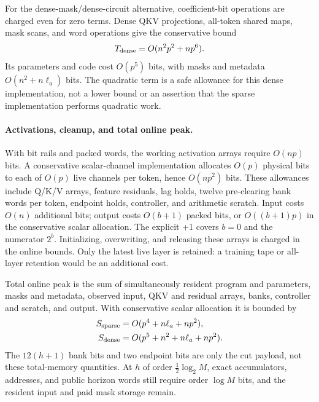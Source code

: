 For the dense-mask/dense-circuit alternative, coefficient-bit operations
are charged even for zero terms. Dense QKV projections, all-token shared
maps, mask scans, and word operations give the conservative bound
\begin{equation}\label{eq:impl-dense-work}
 T_{\rm dense}=O(n^2p^2+np^6).
\end{equation}
Its parameters and code cost $O(p^5)$ bits, with masks and metadata
$O(n^2+n\ell_a)$ bits. The quadratic term is a safe allowance for this
dense implementation, not a lower bound or an assertion that the sparse
implementation performs quadratic work.

\paragraph{Activations, cleanup, and total online peak.}
With bit rails and packed words, the working activation arrays require
$O(np)$ bits. A conservative scalar-channel implementation allocates
$O(p)$ physical bits to each of $O(p)$ live channels per token, hence
$O(np^2)$ bits. These allowances include Q/K/V arrays, feature residuals,
lag holds, twelve pre-clearing bank words per token, endpoint holds,
controller, and arithmetic scratch. Input costs $O(n)$ additional bits;
output costs $O(b+1)$ packed bits, or $O((b+1)p)$ in the conservative
scalar allocation. The explicit +1 covers $b=0$ and the numerator $2^b$.
Initializing, overwriting, and releasing these arrays is charged in the
online bounds. Only the latest live layer is retained: a training tape or
all-layer retention would be an additional cost.

Total online peak is the sum of simultaneously resident program and
parameters, masks and metadata, observed input, QKV and residual arrays,
banks, controller and scratch, and output. With conservative scalar
allocation it is bounded by
\begin{align}
 S_{\rm sparse}&=O(p^4+n\ell_a+np^2),
                  \label{eq:impl-sparse-memory}\\
 S_{\rm dense}&=O(p^5+n^2+n\ell_a+np^2).
                  \label{eq:impl-dense-memory}
\end{align}
The $12(h+1)$ bank bits and two endpoint bits are only the cut payload,
not these total-memory quantities. At $h$ of order $\tfrac12\log_2M$,
exact accumulators, addresses, and public horizon words still require
order $\log M$ bits, and the resident input and paid mask storage remain.

